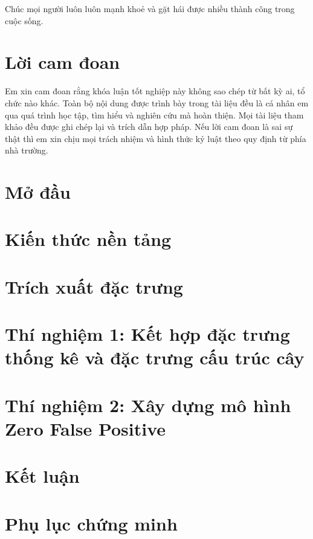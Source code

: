 \documentclass[12pt,a4paper]{report}
\begin{document}
Chúc mọi người luôn luôn mạnh khoẻ và gặt hái được nhiều thành công trong cuộc sống.

\chapter*{Lời cam đoan}

Em xin cam đoan rằng khóa luận tốt nghiệp này không sao chép từ bất kỳ ai,
tổ chức nào khác. Toàn bộ nội dung được trình bày trong tài liệu đều là cá nhân em qua quá
trình học tập, tìm hiểu và nghiên cứu mà hoàn thiện. Mọi tài liệu tham khảo đều được ghi chép
lại và trích dẫn hợp pháp. Nếu lời cam đoan là sai sự thật thì em xin chịu mọi trách nhiệm và
hình thức kỷ luật theo quy định từ phía nhà trường.

\tableofcontents{}
\clearpage{}

\listoffigures{}

\listoftables{}

\lstlistoflistings

\chapter*{Mở đầu}



\chapter{Kiến thức nền tảng}



\chapter{Trích xuất đặc trưng}


\chapter{Thí nghiệm 1: Kết hợp đặc trưng thống kê và đặc trưng cấu trúc cây}





\chapter{Thí nghiệm 2: Xây dựng mô hình Zero False Positive}




\chapter{Kết luận}



\appendix
\chapter{Phụ lục chứng minh}




\nocite{*}

\printbibliography[heading=bibintoc, title=Tài liệu tham khảo]

\end{document}

